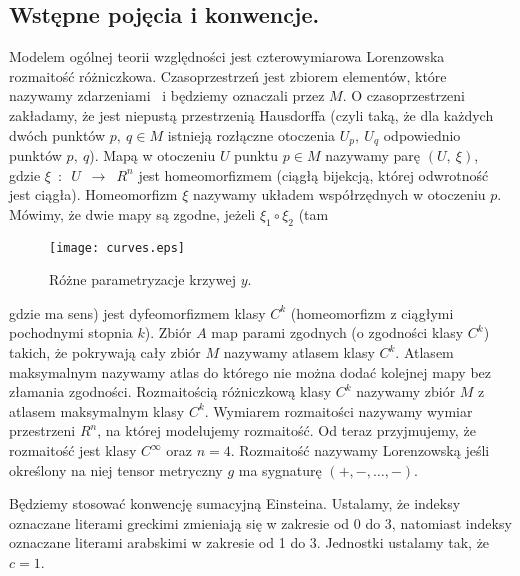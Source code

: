 \subsection{Wstępne pojęcia i konwencje.}
Modelem ogólnej teorii względności jest czterowymiarowa Lorenzowska 
rozmaitość różniczkowa. 
Czasoprzestrzeń jest zbiorem elementów, które nazywamy 
zdarzeniami~\cite{trau1984} i będziemy oznaczali przez $M$.
O czasoprzestrzeni zakładamy, że jest
 niepustą przestrzenią Hausdorffa (czyli taką, że
dla każdych dwóch punktów $p,\ q\in M$ 
istnieją rozłączne otoczenia $U_p,\ U_q$ odpowiednio punktów $p,\ q$). 
Mapą w otoczeniu $U$ punktu $p\in M$ nazywamy parę $(U,\ \xi )$, gdzie  
$\xi$~$:$~$U$~$\to$~$R^n$ jest homeomorfizmem (ciągłą bijekcją, której 
odwrotność jest ciągła). 
Homeomorfizm $\xi$ nazywamy układem współrzędnych 
w otoczeniu $p$.
Mówimy, że dwie mapy są zgodne, jeżeli $\xi_1 \circ \xi_2$ (tam 
\begin{wrapfigure}[29]{r}{4cm}
\centering
\texttt{[image: curves.eps]}
\caption{Różne parametryzacje krzywej $y$.}
\end{wrapfigure}
gdzie ma sens)
jest dyfeomorfizmem klasy $C^k$ (homeomorfizm z 
ciągłymi pochodnymi stopnia $k$). 
Zbiór $A$ map
 parami zgodnych (o zgodności klasy $C^k$) 
takich, że pokrywają cały zbiór $M$ nazywamy 
atlasem klasy $C^k$. Atlasem maksymalnym nazywamy atlas do którego
nie można dodać kolejnej mapy bez złamania zgodności.
Rozmaitością różniczkową klasy $C^k$ nazywamy 
zbiór $M$ z atlasem maksymalnym klasy $C^k$.
Wymiarem rozmaitości nazywamy wymiar przestrzeni $R^n$, na której 
modelujemy rozmaitość. Od teraz przyjmujemy, że rozmaitość 
jest klasy $C^\infty$ oraz $n=4$.
Rozmaitość nazywamy Lorenzowską jeśli określony na niej tensor
metryczny $g$ ma sygnaturę $(+,-,\dots ,-)$.

Będziemy stosować konwencję sumacyjną Einsteina. Ustalamy, że 
indeksy oznaczane literami greckimi zmieniają się w zakresie od 0 do 3, 
natomiast indeksy oznaczane literami arabskimi 
w zakresie od 1 do 3. Jednostki ustalamy tak, że $c=1$.
